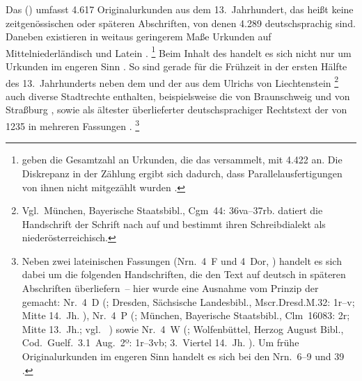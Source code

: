 Das  (\CAO) umfasst 4.617
Originalurkunden aus dem 13.\ Jahrhundert, das heißt keine zeitgenössischen
oder späteren Abschriften, von denen 4.289 deutschsprachig sind. Daneben
existieren in weitaus geringerem Maße Urkunden auf
Mittelniederländisch und Latein
\autocites[\RN{1}]{deboor1976}[25]{schulze2011}[40--41]{ganslmayer2012}.%
%
	\footnote{\citet[391]{gniffkerapp2005} geben die Gesamtzahl an
	Urkunden, die das \CAO{} versammelt, mit 4.422 an. Die
	Diskrepanz in der Zählung ergibt sich dadurch, dass
	Parallelausfertigungen von ihnen nicht mitgezählt wurden
	\autocite[vgl.][40]{ganslmayer2012}.\label{fn:caowordcount}}
%
Beim Inhalt des \CAO{} handelt es sich nicht nur um Urkunden im engeren Sinn
\autocite[596]{schmidtwiegand1998b}. So sind gerade für die Frühzeit in der
ersten Hälfte des 13.~Jahrhunderts neben dem 
\autocites(Nr.~1, Erfurt, um 1200)[1,2--10]{cao1} und der  aus
dem  Ulrichs von Liechtenstein
\autocites(Nr.~3, Schloss Liechtenstein, Bz.~Murtal, 1227)[5,13--40]{cao1}%
%
	\footnote{Vgl.\ München, Bayerische Staatsbibl., Cgm~44: 36va--37rb.
	\citet[230--231]{schneider1987} datiert die Handschrift der Schrift nach
	auf  und bestimmt ihren
	Schreibdialekt als niederösterreichisch.}
%
auch diverse Stadtrechte enthalten, beispielsweise die von Braunschweig
\autocites(Nr.~2, 1227)[1,12--5,11]{cao1} und von Straßburg
\autocites(Nr.~N~238~A und B, 1283 bzw.\ Ende 13.~Jh.)[179,21--194.15;
179,29--194,32]{cao5}, sowie als ältester überlieferter deutschsprachiger
Rechtstext der  von 1235 in mehreren Fassungen
\autocites(Nr.~4)[14,11--17,55]{cao1}.%
%
	\footnote{Neben zwei lateinischen Fassungen (Nrn.~4~F und 4~Dor,
	\cite[5,42--9,17; 9,19--12,15]{cao1}) handelt es sich dabei um die
	folgenden Handschriften, die den Text auf deutsch in späteren Abschriften
	überliefern~-- hier wurde eine Ausnahme vom Prinzip der 
	gemacht:
	Nr.~4~D
		(\cite[14,11--15,53]{cao1};
		Dresden, Sächsische Landesbibl., Mscr.Dresd.M.32: 1r--v;
		Mitte 14.\ Jh.%
		),
	Nr.~4~P
		(\cite[12,17--14,09]{cao1};
		München, Bayerische Staatsbibl., Clm~16083: 2r;
		Mitte 13.\ Jh.; vgl.~\cites[256]{haas2010}%
		) sowie
	Nr.~4~W
		(\cite[14,11--17,55]{cao1};
		Wolfenbüttel, Herzog August Bibl., Cod.~Guelf.~3.1~Aug.~2º: 1r--3vb;
		3.~Viertel 14.~Jh.%
		).
	Um frühe Originalurkunden im engeren Sinn handelt es sich bei den Nrn.~6--9
	und 39 \autocites[20,44--23,24;
	69,2--21]{cao1}[vgl.][15--16]{bertelsmeierkierst2008}.%
	}
